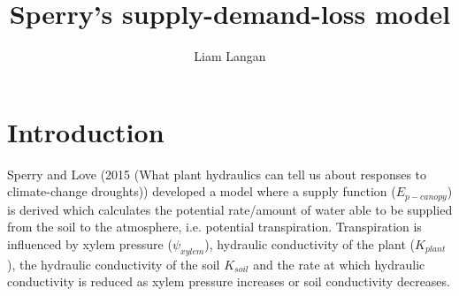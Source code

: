 \documentclass[a4paper]{article}\usepackage[]{graphicx}\usepackage[]{color}
\begin{document}
\title{Sperry's supply-demand-loss model}
\author{Liam Langan}
\maketitle


\section{Introduction}
Sperry and Love (2015 (What plant hydraulics can tell us about responses to climate-change droughts)) developed a model where a supply function ($E_{p-canopy}$) is derived which calculates the potential rate/amount of water able to be supplied from the soil to the atmosphere, i.e. potential transpiration. Transpiration is influenced by xylem pressure ($\psi_{xylem}$), hydraulic conductivity of the plant ($K_{plant}$), the hydraulic conductivity of the soil $K_{soil}$ and the rate at which hydraulic conductivity is reduced as xylem pressure increases or soil conductivity decreases.   
\end{document}
